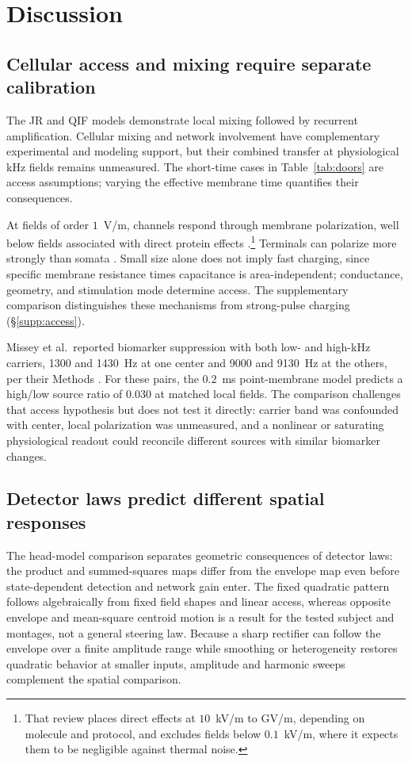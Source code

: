 \documentclass[a4paper]{article}
\newif\ifjne
\begin{document}
\section{Discussion}\label{sec:discussion}
\subsection{Cellular access and mixing require separate calibration}
The JR and QIF models demonstrate local mixing followed by recurrent
amplification. Cellular mixing \cite{mirzakhalili2020,luff2024mixer} and network
involvement \cite{caldas2024,karimi2024,esmaeilpour2021} have complementary
experimental and modeling support, but their combined transfer at physiological
kHz fields remains unmeasured. The short-time cases in Table~\ref{tab:doors}
are access assumptions; varying the effective membrane time quantifies their
consequences.

At fields of order $1$~V/m, channels respond through membrane polarization,
well below fields associated with direct protein effects
\cite{cifra2026}.\footnote{That review places direct effects at $10$~kV/m
to GV/m, depending on molecule and protocol, and excludes fields below
$0.1$~kV/m, where it expects them to be negligible against thermal noise.}
Terminals can polarize more strongly than somata
\cite{rahman2013,aberra2023,chakraborty2018}. Small size alone does not imply
fast charging, since specific membrane resistance times capacitance is
area-independent; conductance, geometry, and stimulation mode determine access.
The supplementary comparison distinguishes these mechanisms from strong-pulse
charging (\S\ref{supp:access}).
\ifjne\else

\fi

Missey et al.\ reported biomarker suppression with both low- and high-kHz carriers,
1300 and 1430~Hz at one center and 9000 and 9130~Hz at the others, per their
Methods \cite{missey2026}. For these pairs, the $0.2$~ms point-membrane
model predicts a high/low source ratio of $0.030$ at matched local fields. The
comparison challenges that access hypothesis but does not test it directly:
carrier band was confounded with center, local polarization was unmeasured, and a
nonlinear or saturating physiological readout could reconcile different sources
with similar biomarker changes.

\subsection{Detector laws predict different spatial responses}
The head-model comparison separates geometric consequences of detector laws:
the product and summed-squares maps differ from the envelope map even before
state-dependent detection and network gain enter. The fixed quadratic
pattern follows algebraically from fixed field shapes and linear access, whereas
opposite envelope and mean-square centroid motion is a result for the
tested subject and montages, not a general steering law. Because a sharp rectifier
can follow the envelope over a finite amplitude range while smoothing or
heterogeneity restores quadratic behavior at smaller inputs, amplitude and
harmonic sweeps complement the spatial comparison.
\end{document}
